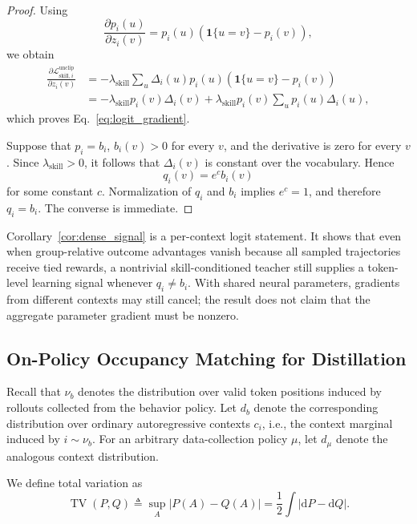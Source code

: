 \begin{proof}
Using
\[
 \frac{\partial p_i(u)}{\partial z_i(v)}
 =
 p_i(u)
 \left(
   \mathbf 1\{u=v\}-p_i(v)
 \right),
\]
we obtain
\begin{align*}
 \frac{
   \partial
   \mathcal L_{\mathrm{skill},i}^{\mathrm{unclip}}
 }{
   \partial z_i(v)
 }
 &=
 -
 \lambda_{\mathrm{skill}}
 \sum_u
 \Delta_i(u)
 p_i(u)
 \left(
   \mathbf 1\{u=v\}-p_i(v)
 \right)
 \\
 &=
 -
 \lambda_{\mathrm{skill}}
 p_i(v)\Delta_i(v)
 +
 \lambda_{\mathrm{skill}}
 p_i(v)
 \sum_u p_i(u)\Delta_i(u),
\end{align*}
which proves Eq.~\ref{eq:logit_gradient}.

Suppose that \(p_i=b_i\), \(b_i(v)>0\) for every \(v\), and the derivative
is zero for every \(v\). Since
\(\lambda_{\mathrm{skill}}>0\), it follows that
\(\Delta_i(v)\) is constant over the vocabulary. Hence
\[
 q_i(v)=e^c b_i(v)
\]
for some constant \(c\). Normalization of \(q_i\) and \(b_i\) implies
\(e^c=1\), and therefore \(q_i=b_i\). The converse is immediate.
\end{proof}

Corollary~\ref{cor:dense_signal} is a per-context logit statement. It shows
that even when group-relative outcome advantages vanish because all sampled
trajectories receive tied rewards, a nontrivial skill-conditioned teacher
still supplies a token-level learning signal whenever \(q_i\neq b_i\).
With shared neural parameters, gradients from different contexts may still
cancel; the result does not claim that the aggregate parameter gradient must
be nonzero.

\subsection{On-Policy Occupancy Matching for Distillation}
\label{app:occupancy_matching}

Recall that \(\nu_b\) denotes the distribution over valid token positions
induced by rollouts collected from the behavior policy. Let \(d_b\) denote
the corresponding distribution over ordinary autoregressive contexts
\(c_i\), i.e., the context marginal induced by \(i\sim\nu_b\). For an
arbitrary data-collection policy \(\mu\), let \(d_\mu\) denote the analogous
context distribution.

We define total variation as
\begin{equation*}
 \operatorname{TV}(P,Q)
 \triangleq
 \sup_A |P(A)-Q(A)|
 =
 \frac{1}{2}
 \int
 \left|
   \mathrm dP-\mathrm dQ
 \right|.
\end{equation*}

